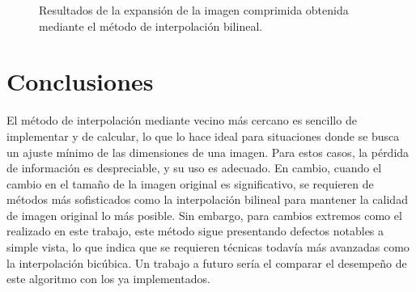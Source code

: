 \documentclass[12pt]{article}
\begin{document}
\begin{figure}[htbp]
	\centering
	\quad
	\caption{Resultados de la expansión de la imagen comprimida obtenida mediante el método de interpolación bilineal.}
	\label{img:expansion_rose_bi}
\end{figure}

\section{Conclusiones}
El método de interpolación mediante vecino más cercano es sencillo de implementar y de calcular, lo que lo hace ideal para situaciones donde se busca un ajuste mínimo de las dimensiones de una imagen. Para estos casos, la pérdida de información es despreciable, y su uso es adecuado. En cambio, cuando el cambio en el tamaño de la imagen original es significativo, se requieren de métodos más sofisticados como la interpolación bilineal para mantener la calidad de imagen original lo más posible. Sin embargo, para cambios extremos como el realizado en este trabajo, este método sigue presentando defectos notables a simple vista, lo que indica que se requieren técnicas todavía más avanzadas como la interpolación bicúbica. Un trabajo a futuro sería el comparar el desempeño de este algoritmo con los ya implementados.
\end{document}
